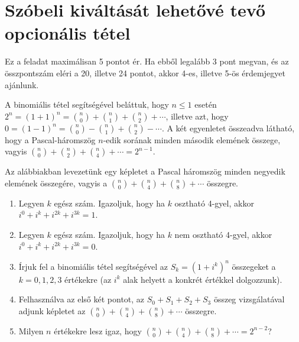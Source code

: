 \documentclass[11pt,a4paper]{article}
\begin{document}
\section{Szóbeli kiváltását lehetővé tevő opcionális tétel}
Ez a feladat maximálisan 5 pontot ér. Ha ebből legalább 3 pont megvan, és az összpontszám eléri a 20, illetve 24 pontot, akkor 4-es, illetve 5-ös érdemjegyet ajánlunk.

A binomiális tétel segítségével beláttuk, hogy $n\leq 1$ esetén $2^n = (1+1)^n =
\binom{n}{0} + \binom{n}{1}  + \binom{n}{2} + \cdots$, illetve azt, hogy
$0 = (1-1)^n = \binom{n}{0} - \binom{n}{1}  + \binom{n}{2} -
\cdots$. A két egyenletet összeadva látható, hogy a
Pascal-háromszög $n$-edik sorának minden második elemének összege,
vagyis $\binom{n}{0} + \binom{n}{2} + \binom{n}{4} + \cdots = 2^{n-1}$.

Az alábbiakban levezetünk egy képletet a Pascal háromszög minden
negyedik elemének összegére, vagyis a $\binom{n}{0} + \binom{n}{4} +
\binom{n}{8} + \cdots$ összegre.

\begin{enumerate}


\item Legyen $k$ egész szám. Igazoljuk, hogy ha $k$ osztható
4-gyel, akkor $i^{0} + i^{k} + i^{2k} + i^{3k} = 1$.


\item Legyen $k$ egész szám. Igazoljuk, hogy ha $k$ nem osztható
4-gyel, akkor $i^{0} + i^{k} + i^{2k} + i^{3k} = 0$.

\item Írjuk fel a binomiális tétel segítségével az $S_k = (1+i^k)^n$
összegeket a $k=0, 1, 2, 3$ értékekre (az $i^k$ alak helyett a konkrét
értékkel dolgozzunk).

\item Felhasználva az első két pontot, az $S_0+S_1 + S_2 + S_3$ összeg
vizsgálatával adjunk képletet az $\binom{n}{0} + \binom{n}{4} +
\binom{n}{8} + \cdots$ összegre.

\item Milyen $n$ értékekre lesz igaz, hogy $\binom{n}{0} + \binom{n}{4} +
\binom{n}{8} + \cdots = 2^{n-2}$?



\end{enumerate}
\end{document}
